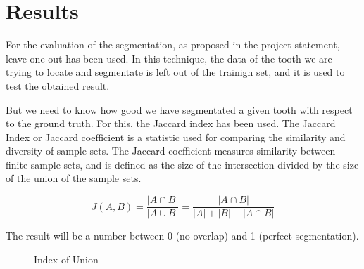 \section{Results}

For the evaluation of the segmentation, as proposed in the
project statement, leave-one-out has been used. In this technique,
the data of the tooth we are trying to locate and segmentate is left
out of the trainign set, and it is used to test the obtained result.

But we need to know how good we have segmentated a given tooth with
respect to the ground truth. For this, the Jaccard index has been used.
The Jaccard Index or Jaccard coefficient is a statistic used for
comparing the similarity and diversity of
sample sets. The Jaccard coefficient measures similarity between
finite sample sets, and is defined as the size of the intersection
divided by the size of the union of the sample sets.

$$ J(A,B) =  \frac{|A \cap B|}{|A \cup B|} = \frac{|A \cap B|}{|A| + |B| + |A \cap B|} $$

The result will be a number between 0 (no overlap) and
1 (perfect segmentation).

 \begin{figure} \centering
  \caption{Index of Union}
\end{figure}

